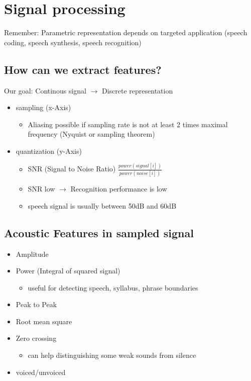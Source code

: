 \newpage

\section{Signal processing}
Remember: Parametric representation depends on targeted application (speech coding, speech synthesis, speech recognition)
\subsection{How can we extract features?}

Our goal: Continous signal $\rightarrow$ Discrete representation

\begin{itemize}
\item sampling (x-Axis)
\begin{itemize}
\item Aliasing possible if sampling rate is not at least 2 times maximal frequency (Nyquist or sampling theorem)
\end{itemize}

\item quantization (y-Axis)
\begin{itemize}
\item SNR (Signal to Noise Ratio) $\frac{power\left(signal\left[i\right]\right)}{power\left(noise\left[i\right]\right)}$
\item SNR low $\rightarrow$ Recognition performance is low
\item speech signal is usually between 50dB and 60dB
\end{itemize}

\end{itemize}

\subsection{Acoustic Features in sampled signal}
\begin{itemize}
\item Amplitude
\item Power (Integral of squared signal)
\begin{itemize}
\item useful for detecting speech, syllabus, phrase boundaries
\end{itemize}
\item Peak to Peak
\item Root mean square
\item Zero crossing
\begin{itemize}
\item can help distinguishing some weak sounds from silence
\end{itemize}
\item voiced/unvoiced


\end{itemize}

